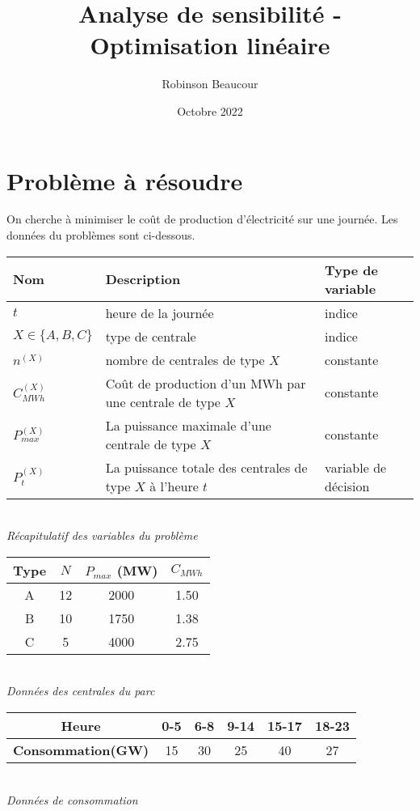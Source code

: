 \documentclass{article}
\title{Analyse de sensibilité - Optimisation linéaire}
\author{Robinson Beaucour}
\date{Octobre 2022}
\begin{document}
\maketitle

\section{Problème à résoudre}
On cherche à minimiser le coût de production d'électricité sur une journée.
Les données du problèmes sont ci-dessous.
\begin{center}
\begin{tabular}{|m{3cm}|m{5.5cm}|m{3cm}|}
    \hline
    \bf Nom & \bf Description & \bf Type de variable \\
    \hline 
    $t$ & heure de la journée & indice \\
    $X\in\{A,B,C\}$ & type de centrale & indice \\
    $n^{(X)}$ & nombre de centrales de type $X$ & constante \\
    $C^{(X)}_{MWh}$ & Coût de production d'un MWh par une centrale de type $X$ & constante\\
    $P^{(X)}_{max}$ & La puissance maximale d'une centrale de type $X$ & constante\\
    $P^{(X)}_{t}$ & La puissance totale des centrales de type $X$ à l'heure $t$ & variable de décision\\
    \hline
\end{tabular}\\[0.1cm]
\centering \it Récapitulatif des variables du problème\\[0.1cm]
\begin{tabular}{|c|c|c|c|}
    \hline
    \bf Type & \bf $N$ & \bf $P_{max}$ (MW) & \bf $C_{MWh}$ \\
    \hline 
    A & 12 & 2000 & 1.50 \\
    B & 10 & 1750 & 1.38 \\
    C & 5 & 4000 & 2.75 \\
    \hline
\end{tabular}\\[0.1cm]
\centering \it Données des centrales du parc\\[0.1cm]
\begin{tabular}{|c|c|c|c|c|c|}
    \hline
    \bf Heure &0-5&6-8&9-14&15-17&18-23\\
    \hline 
    \bf Consommation(GW) &15&30&25&40&27\\
    \hline
\end{tabular}\\[0.1cm]
\it Données de consommation\\[0.1cm]
\end{center}
\end{document}
